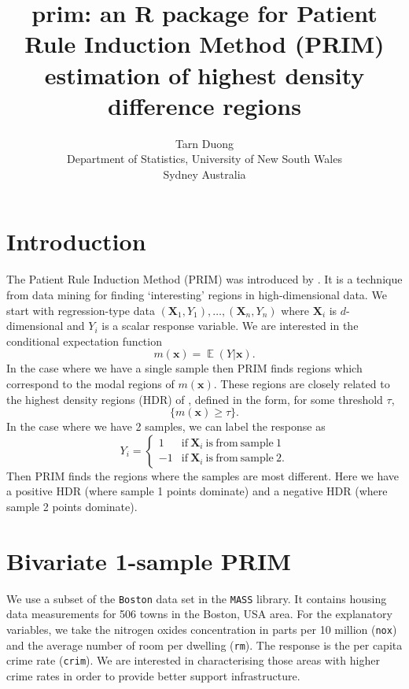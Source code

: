 \documentclass[a4paper,11pt]{article}
\title{prim: an R package for Patient Rule Induction Method (PRIM) estimation of highest density difference regions}
\author{Tarn Duong \\ Department of Statistics, University of New South Wales \\ Sydney Australia}
\renewcommand{\vec}[1]{\boldsymbol{#1}}
\DeclareMathOperator{\E}{\boldsymbol{\mathbb{E}}}
\def\vecx{\vec{x}}
\def\vecX{\vec{X}}
\begin{document}
\maketitle

\section{Introduction}

The Patient Rule Induction Method (PRIM) was introduced
by \citet*{friedman99}. It is a technique from data mining 
for finding `interesting' regions in high-dimensional data. 
We start with regression-type data $(\vecX_1, Y_1), \dots, (\vecX_n, Y_n)$
where $\vecX_i$ is $d$-dimensional and $Y_i$ is a scalar response variable.
We are interested in the conditional expectation function
$$
m(\vecx) = \E (Y | \vecx).    
$$
In the case where we have a single sample then PRIM
finds regions which correspond to the modal regions of $m(\vecx)$. 
These regions are closely related to the highest density regions (HDR) of 
\citet*{hyndman96}, defined in the form, for some threshold $\tau$,
$$
\lbrace m(\vecx) \geq \tau \rbrace.
$$
In the case where we have 2 samples, we can label the response as 
$$Y_i = \begin{cases} 1 & \mathrm{if} \ \vecX_i \ \mathrm{is \ from \ sample\ 1} \\
 -1 & \mathrm{if} \ \vecX_i \ \mathrm{is \ from \ sample\ 2.}
\end{cases}
$$
Then PRIM finds the regions where the samples are most different. 
Here we have a positive HDR (where sample 1 points dominate)
and a negative HDR (where sample 2 points dominate).

 


\section{Bivariate 1-sample PRIM}

We use a subset of the \texttt{Boston} 
data set in the \texttt{MASS} library. It contains
housing data measurements for 506 towns in the Boston, USA area.
For the explanatory variables, we
take the nitrogen oxides concentration in parts per 10 million (\texttt{nox}) 
and the average number of room per dwelling (\texttt{rm}). The 
response is the per capita crime rate (\texttt{crim}). 
We are interested in characterising those areas with higher crime rates
in order to provide better support infrastructure.
\end{document}
